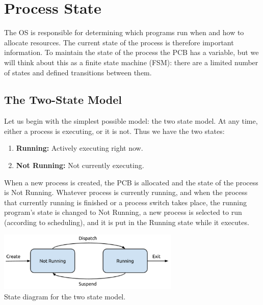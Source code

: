 




\section*{Process State}

The OS is responsible for determining which programs run when and how to allocate resources. The current state of the process is therefore important information. To maintain the state of the process the PCB has a variable, but we will think about this as a finite state machine (FSM): there are a limited number of states and defined transitions between them. 

\subsection*{The Two-State Model}

Let us begin with the simplest possible model: the two state model. At any time, either a process is executing, or it is not. Thus we have the two states: 

\begin{enumerate}
	\item \textbf{Running:} Actively executing right now.
	\item \textbf{Not Running:} Not currently executing.
\end{enumerate}

When a new process is created, the PCB is allocated and the state of the process is Not Running. Whatever process is currently running, and when the process that currently running is finished or a process switch takes place, the running program's state is changed to Not Running, a new process is selected to run (according to scheduling), and it is put in the Running state while it executes.

\begin{center}
\includegraphics[width=0.65\textwidth]{images/2-state-model.png}\\
State diagram for the two state model.
\end{center}


